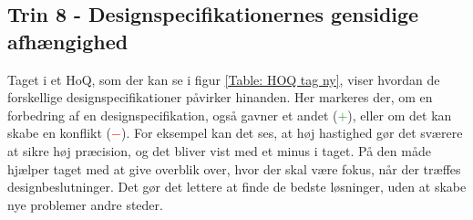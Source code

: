 \subsection{Trin 8 - Designspecifikationernes gensidige afhængighed} \label{Trin 8}

Taget i et HoQ, som der kan se i figur \ref{Table: HOQ tag ny}, viser hvordan de forskellige designspecifikationer påvirker hinanden. Her markeres der, om en forbedring af en designspecifikation, også gavner et andet (\textcolor{ForestGreen}{$+$}), eller om det kan skabe en konflikt (\textcolor{red}{$-$}). For eksempel kan det ses, at høj hastighed gør det sværere at sikre høj præcision, og det bliver vist med et minus i taget. På den måde hjælper taget med at give overblik over, hvor der skal være fokus, når der træffes designbeslutninger. Det gør det lettere at finde de bedste løsninger, uden at skabe nye problemer andre steder.


